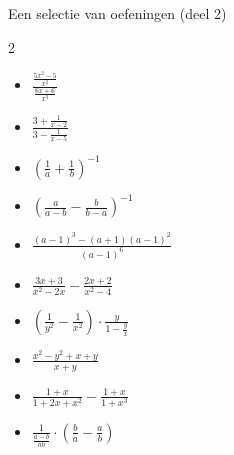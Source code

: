 \begin{lesactiviteit}{Een selectie van oefeningen (deel 2)}
\begin{multicols}{2}
\begin{vraagenantwoord}[start=5]
\begin{itemize}[label=\textcolor{\rubriekkleur}{\Large\textbullet}]
    \end{itemize}
    \begin{itemize}[label=\textcolor{\rubriekkleur}{\Large\textbullet}] 
    \item $\frac{\frac{5x^2-5}{x^2}}{\frac{6x+6}{x^3}}$
    \item $\frac{3+\frac{1}{x-2}}{3-\frac{1}{x-5}}$
    \end{itemize}
    \begin{itemize}[label=\textcolor{\rubriekkleur}{\Large\textbullet}] 
    \item $(\frac{1}{a}+\frac{1}{b})^{-1}$
    \item $(\frac{a}{a-b}-\frac{b}{b-a})^{-1}$
    \end{itemize}
    \begin{itemize}[label=\textcolor{\rubriekkleur}{\Large\textbullet}] 
    \item $\frac{(a-1)^3-(a+1)(a-1)^2}{(a-1)^6}$
    \item $\frac{3x+3}{x^2-2x}-\frac{2x+2}{x^2-4}$
    \item $(\frac{1}{y^2}-\frac{1}{x^2})\cdot \frac{y}{1-\frac{y}{x}}$
    \item $\frac{x^2-y^2+x+y}{x+y}$
    \item $\frac{1+x}{1+2x+x^2}-\frac{1+x}{1+x^3}$
    \item $\frac{1}{\frac{a-b}{ab}}\cdot (\frac{b}{a}-\frac{a}{b})$
    \end{itemize}
\end{vraagenantwoord}
 \end{multicols}   
\end{lesactiviteit}




